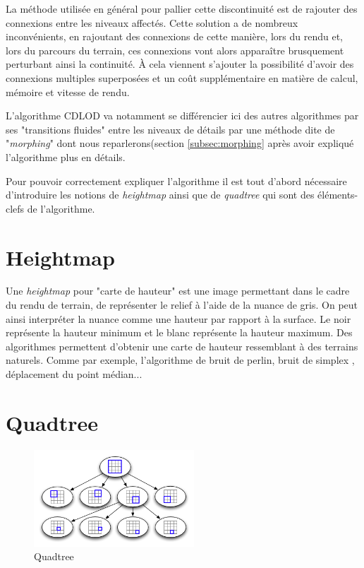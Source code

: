  
 La méthode utilisée en général pour pallier cette discontinuité est de rajouter des connexions entre les niveaux affectés. 
 Cette solution a de nombreux inconvénients, en rajoutant des connexions de cette manière, lors du rendu et, lors du parcours du terrain, ces connexions vont alors apparaître brusquement perturbant ainsi la continuité. À cela viennent s'ajouter la possibilité d'avoir des connexions multiples superposées et un coût supplémentaire en matière de calcul, mémoire et vitesse de rendu.
 
 L'algorithme CDLOD va notamment se différencier ici des autres algorithmes par ses "transitions fluides" entre les niveaux de détails par une méthode dite de "\textit{morphing}" dont nous reparlerons(section \ref{subsec:morphing} après avoir expliqué l'algorithme plus en détails.
 
 Pour pouvoir correctement expliquer l'algorithme il est tout d'abord nécessaire d'introduire les notions de  \textit{heightmap} ainsi que de \textit{quadtree} qui sont des éléments-clefs de l'algorithme.
 
  \section{Heightmap}
  \label{sec:heightmap}
  
  Une \emph{heightmap} pour "carte de hauteur" est une image permettant dans le cadre du rendu de terrain, de représenter le relief à l'aide de la nuance de gris. On peut ainsi interpréter la nuance comme une hauteur par rapport à la surface. Le noir représente la hauteur minimum et le blanc représente la hauteur maximum. Des algorithmes permettent d'obtenir une carte de hauteur ressemblant à des terrains naturels. Comme par exemple, l'algorithme de bruit de perlin, bruit de simplex , déplacement du point médian...
   
  
  
  
  \section{Quadtree}
  \label{sec:quadtree}
  
\begin{figure}
 \includegraphics[width=6cm]{img/quadtree-arbre.png}
   \caption[Quadtree]{Quadtree\protect\footnotemark}
   \label{fig:quadtree-arbre}
 \end{figure}
  
